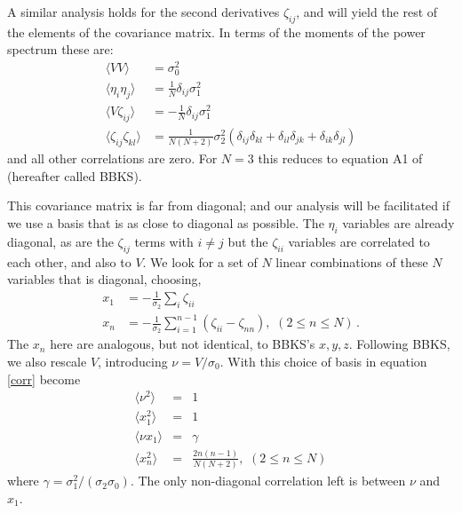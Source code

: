 \documentclass[12pt]{article}
\begin{document}
A similar analysis holds for the second derivatives $\zeta_{ij}$, and will yield the rest of the elements of the covariance matrix. In terms of the moments of the power spectrum these are:
%
\begin{equation} \label{corr}
\begin{split}
\langle VV \rangle &= \sigma_0^2 \\
\langle\eta_i\eta_j\rangle &= \frac{1}{N}\delta_{ij}\sigma_1^2 \\
\langle V\zeta_{ij}\rangle &= -\frac{1}{N}\delta_{ij}\sigma_1^2 \\
\langle\zeta_{ij}\zeta_{kl}\rangle &= \frac{1}{N(N+2)}\sigma_2^2(\delta_{ij}\delta_{kl}+\delta_{il}\delta_{jk}+\delta_{ik}\delta_{jl})
\end{split}
\end{equation}
%
and all other correlations are zero. For $N=3$ this reduces to equation A1 of \cite{BBKS} (hereafter called BBKS). 

This covariance matrix is far from diagonal; and our analysis will be facilitated if we use a basis that is as close to diagonal as possible. The $\eta_i$ variables are already diagonal, as are the $\zeta_{ij}$ terms with $i\neq j$ but the $\zeta_{ii}$ variables are correlated to each other, and also  to $V$. We look for a set of $N$ linear combinations of these $N$ variables that is diagonal, choosing,
\begin{align}
\label{BasisTransform}
x_1 &= -\frac{1}{\sigma_2}\sum_i\zeta_{ii} \nonumber \\
x_n &= -\frac{1}{\sigma_2}\sum_{i=1}^{n-1}\left(\zeta_{ii}-\zeta_{nn}\right),\,\, (2\leq n \leq N) \, .
\end{align}
%
The $x_n$ here are analogous, but not identical, to BBKS's $x, y, z$. Following BBKS, we also rescale $V$, introducing $\nu = V/\sigma_0$. With this choice of basis in equation \eqref{corr} become
%
\begin{eqnarray}
  \langle\nu^2\rangle &=& 1 \nonumber\\
  \langle x_1^2\rangle&=&1 \\
  \langle\nu x_1\rangle &=& \gamma \nonumber\\
  \langle x_n^2 \rangle &=& \frac{2n(n-1)}{N(N+2)},\,\, (2\leq n \leq N) \nonumber
\end{eqnarray}
%
\noindent where $\gamma = \sigma_1^2/(\sigma_2 \sigma_0)$. The only non-diagonal correlation left is between $\nu$ and $x_1$.
\end{document}
